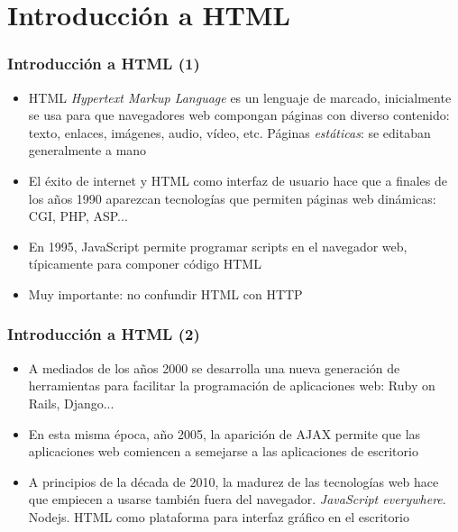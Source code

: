 \documentclass[ucs]{beamer}
\begin{document}
\section{Introducción a HTML}
\begin{frame}[fragile]
\frametitle{Introducción a HTML (1)}
\begin{itemize}
\item
HTML \emph{Hypertext Markup Language} es un lenguaje de marcado, inicialmente se usa para que navegadores web
compongan páginas con diverso contenido: texto, enlaces, imágenes,
audio, vídeo, etc. Páginas \emph{estáticas}: se editaban generalmente a mano

\item
El éxito de internet y HTML como interfaz de usuario hace que 
a finales de los años 1990 aparezcan tecnologías que permiten 
páginas web dinámicas: CGI, PHP, ASP...

\item
En 1995, JavaScript permite programar scripts en el navegador web, típicamente
para componer código HTML

\item
Muy importante: no confundir HTML con HTTP


\end{itemize}
\end{frame}

\begin{frame}[fragile]
\frametitle{Introducción a HTML (2)}
\begin{itemize}
\item
A mediados de los años 2000 se desarrolla una nueva generación de herramientas 
para facilitar la programación de aplicaciones web:
Ruby on Rails, Django... 

\item
En esta misma época, año 2005, la aparición de AJAX permite que las aplicaciones
web comiencen a semejarse a las aplicaciones de escritorio

\item
A principios de la década de 2010, la madurez de las tecnologías web hace
que empiecen a usarse también fuera del navegador. \emph{JavaScript everywhere}.
Nodejs.
HTML como plataforma para interfaz gráfico en el escritorio 


\end{itemize}

\end{frame}
\end{document}
